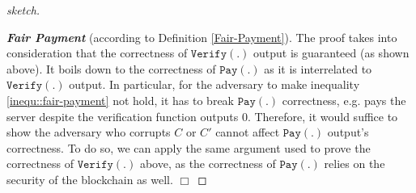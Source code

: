 \begin{proof}[sketch]
\

\noindent\textbf{\textit{Fair Payment}} (according to Definition \ref{Fair-Payment}).  The proof  takes into consideration that the correctness of $\mathtt{Verify}(.)$ output is guaranteed (as shown above). It boils down to the correctness of $\mathtt{Pay}(.)$ as it is interrelated to $\mathtt{Verify}(.)$ output. In particular, for the adversary to make  inequality \ref{inequ::fair-payment} not  hold, it has to break $\mathtt{Pay}(.)$ correctness, e.g. pays the server despite the verification function outputs $0$. Therefore, it would suffice to show the adversary who corrupts $C$ or $C'$ cannot affect $\mathtt{Pay}(.)$ output's correctness. To do so, we can apply the same argument used to prove  the correctness of $\mathtt{Verify}(.)$ above, as the correctness of  $\mathtt{Pay}(.)$ relies on the security of the blockchain as well.  \hfill\(\Box\)
\end{proof}
